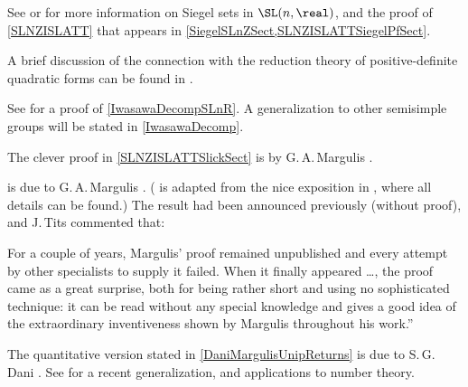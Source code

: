 \begin{notes}

See \cite[\S1]{Borel-IntroGrpArith} or \cite[\S4.2]{PlatonovRapinchukBook} for more information on Siegel sets in $\SL(n,\real)$, and the proof of \cref{SLNZISLATT} that appears in \cref{SiegelSLnZSect,SLNZISLATTSiegelPfSect}.

A brief discussion of the connection with the reduction theory of positive-definite quadratic forms can be found in \cite[\S2, pp.~20--24]{Borel-IntroGrpArith}.

See  \cite[Prop.~3.12, p.~129]{PlatonovRapinchukBook} for a proof of \cref{IwasawaDecompSLnR}. A generalization to other semisimple groups will be stated in \cref{IwasawaDecomp}.

The clever proof in \cref{SLNZISLATTSlickSect} is by G.\,A.\,Margulis \cite[Rem.~3.12(II)]{Margulis-LieGrpsErgThy}.

 is due to G.\,A.\,Margulis \cite{Margulis-OnActionUnip}. 
( is adapted from the nice exposition in \cite[Appendix, pp.~162--173]{DaniMargulis-elementary}, where all details can be found.)
The result had been announced previously (without proof), and
J.\,Tits \cite[p.~59]{Tits-WorkOfMargulis} commented that:
	\par\smallbreak\begin{narrower}\begin{narrower}
	\noindent \sffamily
{}For a couple of years, Margulis' proof remained unpublished and every attempt
by other specialists to supply it failed. When it  finally appeared \dots, the proof
came as a great surprise, both for being rather short and using no sophisticated
technique: it can be read without any special knowledge and gives a good idea of
the extraordinary inventiveness shown by Margulis throughout his work\zz.''
	\par\end{narrower}\end{narrower}\smallbreak

The quantitative version stated in \cref{DaniMargulisUnipReturns} is due to S.\,G.\,Dani \cite{Dani-LemmaOfMargulis}. 
See \cite{Kleinbock-QuantitativeNondivergence} for a recent generalization, and applications to number theory.

\end{notes}


